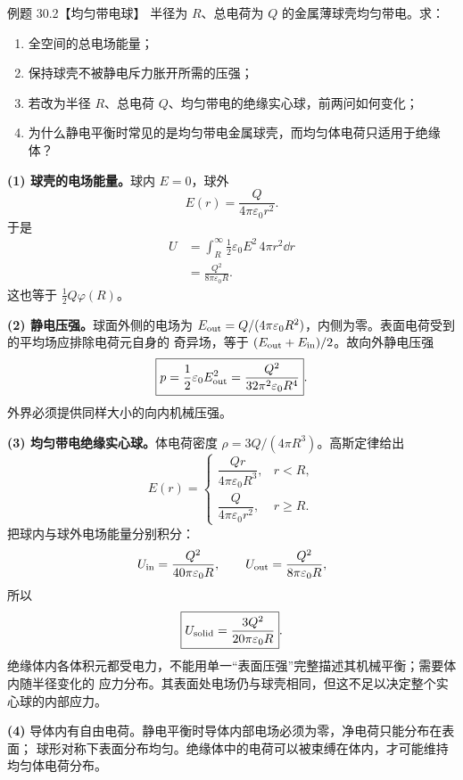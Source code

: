 \Needspace{0.37\textheight}
\begin{origexamplebox}{例题 30.2【均匀带电球】}
半径为 $R$、总电荷为 $Q$ 的金属薄球壳均匀带电。求：
\begin{enumerate}[label=(\arabic*),leftmargin=2.2em]
  \item 全空间的总电场能量；
  \item 保持球壳不被静电斥力胀开所需的压强；
  \item 若改为半径 $R$、总电荷 $Q$、均匀带电的绝缘实心球，前两问如何变化；
  \item 为什么静电平衡时常见的是均匀带电金属球壳，而均匀体电荷只适用于绝缘体？
\end{enumerate}
\sphereEnergyDiagram
\end{origexamplebox}

\begin{xesolution}
\textbf{(1) 球壳的电场能量。}球内 $E=0$，球外
\[
  E(r)=\frac{Q}{4\pi\varepsilon_0r^2}.
\]
于是
\begin{align*}
  U&=\int_R^\infty\frac12\varepsilon_0E^2\,4\pi r^2\dd r\\
   &=\boxed{\frac{Q^2}{8\pi\varepsilon_0R}}.
\end{align*}
这也等于 $\tfrac12Q\varphi(R)$。

\textbf{(2) 静电压强。}球面外侧的电场为
$E_{\rm out}=Q/(4\pi\varepsilon_0R^2)$，内侧为零。表面电荷受到的平均场应排除电荷元自身的
奇异场，等于 $(E_{\rm out}+E_{\rm in})/2$。故向外静电压强
\[
  \boxed{p=\frac12\varepsilon_0E_{\rm out}^2
  =\frac{Q^2}{32\pi^2\varepsilon_0R^4}}.
\]
外界必须提供同样大小的向内机械压强。

\textbf{(3) 均匀带电绝缘实心球。}体电荷密度
$\rho=3Q/(4\pi R^3)$。高斯定律给出
\[
  E(r)=
  \begin{cases}
    \dfrac{Qr}{4\pi\varepsilon_0R^3},&r<R,\\[5pt]
    \dfrac{Q}{4\pi\varepsilon_0r^2},&r\ge R.
  \end{cases}
\]
把球内与球外电场能量分别积分：
\[
  U_{\rm in}=\frac{Q^2}{40\pi\varepsilon_0R},
  \qquad
  U_{\rm out}=\frac{Q^2}{8\pi\varepsilon_0R},
\]
所以
\[
  \boxed{U_{\rm solid}=\frac{3Q^2}{20\pi\varepsilon_0R}}.
\]
绝缘体内各体积元都受电力，不能用单一“表面压强”完整描述其机械平衡；需要体内随半径变化的
应力分布。其表面处电场仍与球壳相同，但这不足以决定整个实心球的内部应力。

\textbf{(4)} 导体内有自由电荷。静电平衡时导体内部电场必须为零，净电荷只能分布在表面；
球形对称下表面分布均匀。绝缘体中的电荷可以被束缚在体内，才可能维持均匀体电荷分布。
\end{xesolution}

